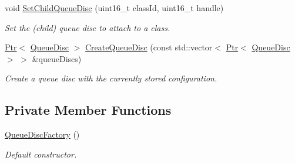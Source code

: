 \begin{DoxyCompactItemize}
void \hyperlink{classns3_1_1QueueDiscFactory_a9fe5f5261015760e2ae2511bd3fcedcd}{Set\+Child\+Queue\+Disc} (uint16\+\_\+t class\+Id, uint16\+\_\+t handle)
\begin{DoxyCompactList}\small\item\em Set the (child) queue disc to attach to a class. \end{DoxyCompactList}\item 
\hyperlink{classns3_1_1Ptr}{Ptr}$<$ \hyperlink{classns3_1_1QueueDisc}{Queue\+Disc} $>$ \hyperlink{classns3_1_1QueueDiscFactory_a54976e363c67dc502dc67bafbdb59669}{Create\+Queue\+Disc} (const std\+::vector$<$ \hyperlink{classns3_1_1Ptr}{Ptr}$<$ \hyperlink{classns3_1_1QueueDisc}{Queue\+Disc} $>$ $>$ \&queue\+Discs)
\begin{DoxyCompactList}\small\item\em Create a queue disc with the currently stored configuration. \end{DoxyCompactList}\end{DoxyCompactItemize}
\subsection*{Private Member Functions}
\begin{DoxyCompactItemize}
\item 
\hyperlink{classns3_1_1QueueDiscFactory_aab8fab457fcfed5d1e05bd5bc0ce1871}{Queue\+Disc\+Factory} ()
\begin{DoxyCompactList}\small\item\em Default constructor. \end{DoxyCompactList}\end{DoxyCompactItemize}
